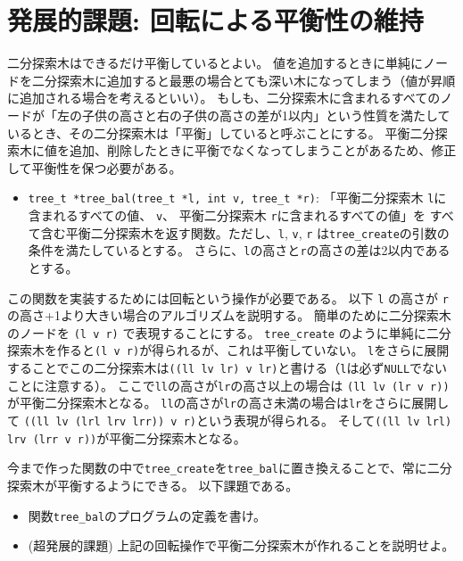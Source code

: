 \documentclass[a4paper,twoside,onecolumn,openany,article]{memoir}
\theoremstyle{remark}
\begin{document}
\section{発展的課題: 回転による平衡性の維持}
二分探索木はできるだけ平衡しているとよい。
値を追加するときに単純にノードを二分探索木に追加すると最悪の場合とても深い木になってしまう（値が昇順に追加される場合を考えるといい）。
もしも、二分探索木に含まれるすべてのノードが「左の子供の高さと右の子供の高さの差が1以内」という性質を満たしているとき、その二分探索木は「平衡」していると呼ぶことにする。
平衡二分探索木に値を追加、削除したときに平衡でなくなってしまうことがあるため、修正して平衡性を保つ必要がある。
\begin{itemize}
\item \texttt{tree\_t *tree\_bal(tree\_t *l, int v, tree\_t *r)}: 「平衡二分探索木 \texttt{l}に含まれるすべての値、 \texttt{v}、 平衡二分探索木 \texttt{r}に含まれるすべての値」を
すべて含む平衡二分探索木を返す関数。ただし、\texttt{l}, \texttt{v}, \texttt{r} は\texttt{tree\_create}の引数の条件を満たしているとする。
さらに、\texttt{l}の高さと\texttt{r}の高さの差は2以内であるとする。
\end{itemize}
この関数を実装するためには回転という操作が必要である。
以下 \texttt{l} の高さが \texttt{r} の高さ+1より大きい場合のアルゴリズムを説明する。
簡単のために二分探索木のノードを \texttt{(l v r)} で表現することにする。
\texttt{tree\_create} のように単純に二分探索木を作ると\texttt{(l v r)}が得られるが、これは平衡していない。
\texttt{l}をさらに展開することでこの二分探索木は\texttt{((ll lv lr) v lr)}と書ける（\texttt{l}は必ず\texttt{NULL}でないことに注意する）。
ここで\texttt{ll}の高さが\texttt{lr}の高さ以上の場合は
\texttt{(ll lv (lr v r))}が平衡二分探索木となる。
\texttt{ll}の高さが\texttt{lr}の高さ未満の場合は\texttt{lr}をさらに展開して
\texttt{((ll lv (lrl lrv lrr)) v r)}という表現が得られる。
そして\texttt{((ll lv lrl) lrv (lrr v r))}が平衡二分探索木となる。

今まで作った関数の中で\texttt{tree\_create}を\texttt{tree\_bal}に置き換えることで、常に二分探索木が平衡するようにできる。
以下課題である。
\begin{itemize}
\item 関数\texttt{tree\_bal}のプログラムの定義を書け。
\item (超発展的課題) 上記の回転操作で平衡二分探索木が作れることを説明せよ。
\end{itemize}
\end{document}
